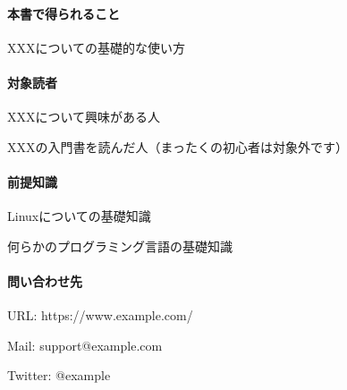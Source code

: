 \paragraph*{本書で得られること}
\label{sec:-0-0-0-1}

\begin{starteritemize}
\item XXXについての基礎的な使い方
\end{starteritemize}

\paragraph*{対象読者}
\label{sec:-0-0-0-2}

\begin{starteritemize}
\item XXXについて興味がある人
\item XXXの入門書を読んだ人（まったくの初心者は対象外です）
\end{starteritemize}

\paragraph*{前提知識}
\label{sec:-0-0-0-3}

\begin{starteritemize}
\item Linuxについての基礎知識
\item 何らかのプログラミング言語の基礎知識
\end{starteritemize}

\paragraph*{問い合わせ先}
\label{sec:-0-0-0-4}

\begin{starteritemize}
\item URL: https://www.example.com/
\item Mail: support@example.com
\item Twitter: @example
\end{starteritemize}

